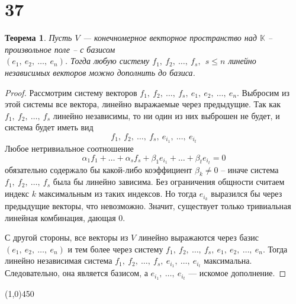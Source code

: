 \documentclass[a4paper,12pt]{article}
\newtheorem*{theorem}{Теорема}
\begin{document}
	\section*{37}
	\begin{theorem}
		Пусть $V$ --- конечномерное векторное пространство над $\mathbb{K}$ -- произвольное поле -- с базисом\\ $(e_1,\ e_2,\ \ldots,\ e_n)$. Тогда любую систему $f_1,\ f_2,\ \ldots,\ f_s,\ \  s \leqslant n$ линейно независимых векторов можно дополнить до базиса.
	\end{theorem}
	\begin{proof}
		Рассмотрим систему векторов $f_1,\ f_2,\ \ldots,\ f_s,\ e_1,\ e_2,\ \ldots,\ e_n$. Выбросим из этой системы все вектора, линейно выражаемые через предыдущие. Так как $f_1,\ f_2,\ \ldots,\ f_s$ линейно независимы, то ни один из них выброшен не будет, и система будет иметь вид
		\[f_1,\ f_2,\ \ldots,\ f_s,\ e_{i_1},\ \ldots,\ e_{i_t}\]
		Любое нетривиальное соотношение
		\[\alpha_1 f_1 + \ldots + \alpha_s f_s + \beta_1 e_{i_1} + \ldots + \beta_t e_{i_t} = 0\]
		обязательно содержало бы какой-либо коэффициент $\beta_{k} \neq 0$ -- иначе система $f_1,\ f_2,\ \ldots,\ f_s$ была бы линейно зависима. Без ограничения общности считаем индекс $k$ максимальным из таких индексов. Но тогда $e_{i_k}$ выразился бы через предыдущие векторы, что невозможно. Значит, существует только тривиальная линейная комбинация, дающая 0.
		
		С другой стороны, все векторы из $V$ линейно выражаются через базис $(e_1,\ e_2,\ \ldots,\ e_n)$ и тем более через систему $f_1,\ f_2,\ \ldots,\ f_s,\ e_1,\ e_2,\ \ldots,\ e_n$. Тогда линейно независимая система $f_1,\ f_2,\ \ldots,\ f_s,\ e_{i_1},\ \ldots,\ e_{i_t}$ максимальна. Следовательно, она является базисом, а $e_{i_1},\ \ldots,\ e_{i_t}$ --- искомое дополнение.
	\end{proof}
	\begin{center}
		\line(1,0){450}
	\end{center}
\end{document}

